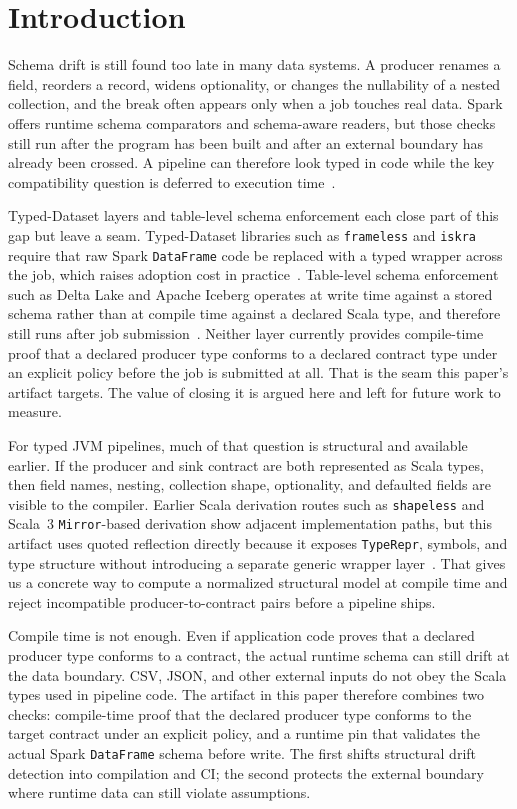 \section{Introduction}

Schema drift is still found too late in many data systems. A producer renames a field, reorders a record, widens optionality, or changes the nullability of a nested collection, and the break often appears only when a job touches real data. Spark offers runtime schema comparators and schema-aware readers, but those checks still run after the program has been built and after an external boundary has already been crossed. A pipeline can therefore look typed in code while the key compatibility question is deferred to execution time~\cite{spark_datatype}.

Typed-Dataset layers and table-level schema enforcement each close part of this gap but leave a seam. Typed-Dataset libraries such as \texttt{frameless} and \texttt{iskra} require that raw Spark \texttt{DataFrame} code be replaced with a typed wrapper across the job, which raises adoption cost in practice~\cite{frameless,iskra}. Table-level schema enforcement such as Delta Lake and Apache Iceberg operates at write time against a stored schema rather than at compile time against a declared Scala type, and therefore still runs after job submission~\cite{delta_lake,apache_iceberg}. Neither layer currently provides compile-time proof that a declared producer type conforms to a declared contract type under an explicit policy before the job is submitted at all. That is the seam this paper's artifact targets. The value of closing it is argued here and left for future work to measure.

For typed JVM pipelines, much of that question is structural and available earlier. If the producer and sink contract are both represented as Scala types, then field names, nesting, collection shape, optionality, and defaulted fields are visible to the compiler. Earlier Scala derivation routes such as \texttt{shapeless} and Scala~3 \texttt{Mirror}-based derivation show adjacent implementation paths, but this artifact uses quoted reflection directly because it exposes \texttt{TypeRepr}, symbols, and type structure without introducing a separate generic wrapper layer~\cite{shapeless,scala3_reflection}. That gives us a concrete way to compute a normalized structural model at compile time and reject incompatible producer-to-contract pairs before a pipeline ships.

Compile time is not enough. Even if application code proves that a declared producer type conforms to a contract, the actual runtime schema can still drift at the data boundary. CSV, JSON, and other external inputs do not obey the Scala types used in pipeline code. The artifact in this paper therefore combines two checks: compile-time proof that the declared producer type conforms to the target contract under an explicit policy, and a runtime pin that validates the actual Spark \texttt{DataFrame} schema before write. The first shifts structural drift detection into compilation and CI; the second protects the external boundary where runtime data can still violate assumptions.

